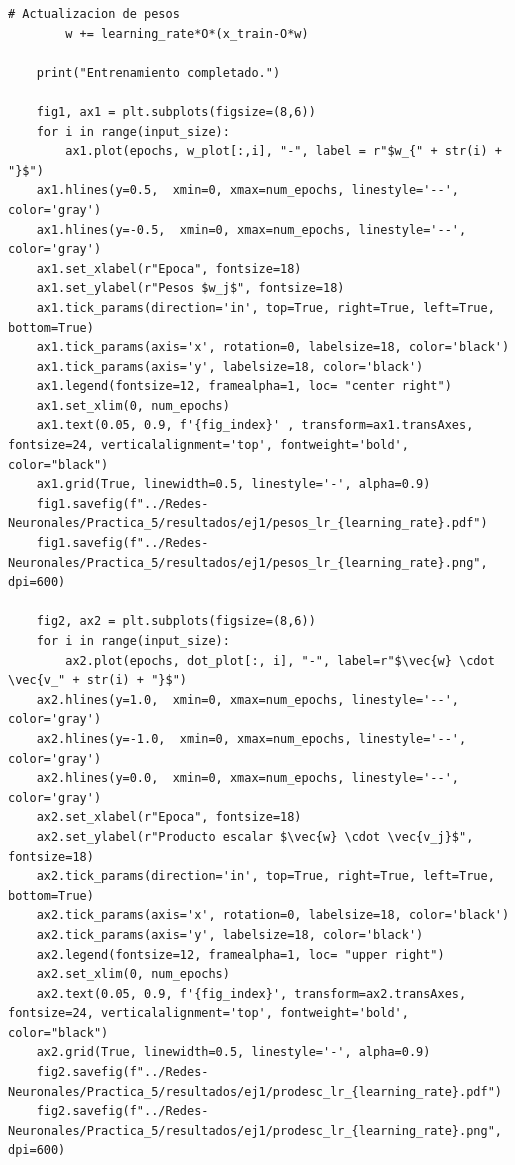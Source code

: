 \documentclass[11pt,twocolumn,twoside]{opticajnl}
\begin{document}
\begin{onecolumn}
\begin{lstlisting}[style=mystyle]
        # Actualizacion de pesos
        w += learning_rate*O*(x_train-O*w)
    
    print("Entrenamiento completado.")
    
    fig1, ax1 = plt.subplots(figsize=(8,6))
    for i in range(input_size):
        ax1.plot(epochs, w_plot[:,i], "-", label = r"$w_{" + str(i) + "}$")
    ax1.hlines(y=0.5,  xmin=0, xmax=num_epochs, linestyle='--', color='gray')
    ax1.hlines(y=-0.5,  xmin=0, xmax=num_epochs, linestyle='--', color='gray')
    ax1.set_xlabel(r"Epoca", fontsize=18)
    ax1.set_ylabel(r"Pesos $w_j$", fontsize=18)
    ax1.tick_params(direction='in', top=True, right=True, left=True, bottom=True)
    ax1.tick_params(axis='x', rotation=0, labelsize=18, color='black')
    ax1.tick_params(axis='y', labelsize=18, color='black')
    ax1.legend(fontsize=12, framealpha=1, loc= "center right")
    ax1.set_xlim(0, num_epochs)
    ax1.text(0.05, 0.9, f'{fig_index}' , transform=ax1.transAxes, fontsize=24, verticalalignment='top', fontweight='bold', color="black")
    ax1.grid(True, linewidth=0.5, linestyle='-', alpha=0.9)
    fig1.savefig(f"../Redes-Neuronales/Practica_5/resultados/ej1/pesos_lr_{learning_rate}.pdf")
    fig1.savefig(f"../Redes-Neuronales/Practica_5/resultados/ej1/pesos_lr_{learning_rate}.png", dpi=600)
    
    fig2, ax2 = plt.subplots(figsize=(8,6))
    for i in range(input_size):
        ax2.plot(epochs, dot_plot[:, i], "-", label=r"$\vec{w} \cdot \vec{v_" + str(i) + "}$")
    ax2.hlines(y=1.0,  xmin=0, xmax=num_epochs, linestyle='--', color='gray')
    ax2.hlines(y=-1.0,  xmin=0, xmax=num_epochs, linestyle='--', color='gray')
    ax2.hlines(y=0.0,  xmin=0, xmax=num_epochs, linestyle='--', color='gray')
    ax2.set_xlabel(r"Epoca", fontsize=18)
    ax2.set_ylabel(r"Producto escalar $\vec{w} \cdot \vec{v_j}$", fontsize=18)
    ax2.tick_params(direction='in', top=True, right=True, left=True, bottom=True)
    ax2.tick_params(axis='x', rotation=0, labelsize=18, color='black')
    ax2.tick_params(axis='y', labelsize=18, color='black')
    ax2.legend(fontsize=12, framealpha=1, loc= "upper right")
    ax2.set_xlim(0, num_epochs)
    ax2.text(0.05, 0.9, f'{fig_index}', transform=ax2.transAxes, fontsize=24, verticalalignment='top', fontweight='bold', color="black")
    ax2.grid(True, linewidth=0.5, linestyle='-', alpha=0.9)
    fig2.savefig(f"../Redes-Neuronales/Practica_5/resultados/ej1/prodesc_lr_{learning_rate}.pdf")
    fig2.savefig(f"../Redes-Neuronales/Practica_5/resultados/ej1/prodesc_lr_{learning_rate}.png", dpi=600)



\end{lstlisting}
\end{onecolumn}
\end{document}
